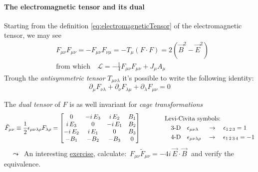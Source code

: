 \documentclass[class=article]{standalone}
\begin{document}
\paragraph{The electromagnetic tensor and its dual}
Starting from the definition \ref{eq:electromagneticTensor} of the electromagnetic tensor, we may see
\begin{equation*}
\begin{split}
& F_{\mu \nu} F_{\mu \nu} = - F_{\mu \nu} F_{\nu \mu} = - T_{\mu} (F \cdot F) = 2 (\vec B^2 - \vec E^2) \\
& \mbox{from which} \quad \mathcal{L} = - \frac{1}{4} F_{\mu \nu} F_{\mu \nu} + J_{\mu} A_{\mu}
\end{split}
\end{equation*}
Trough the \emph{antisymmetric tensor} $T_{\mu \nu \lambda}$ it's possible to write the following identity:
\begin{equation*}
\partial_{\mu} F_{\nu \lambda} + \partial_{\nu} F_{\lambda \mu} + \partial_{\lambda} F_{\mu \nu} = 0
\end{equation*}

The \emph{dual tensor} of $F$ is as well invariant for \emph{cage transformations}
\begin{equation*}
\begin{split}
\tilde{F}_{\mu \nu} \equiv \frac{1}{2} \epsilon_{\mu \nu \lambda \rho} F_{\lambda \rho} 
= \mqty[
0 	  & - i\,E_3 	&  i\,E_2 	& B_1 \\
i\,E_3 & 0     	&  - i\,E_1   	& B_2 \\
-i\,E_2 & i\,E_1   	&  0   	& B_3 \\
-B_1	  & -B_2	& -B_3 	& 0
]
\end{split} \quad\quad
\begin{split}
\quad\quad & \mbox{Levi-Civita symbols:} \\
&\quad \mbox{3-D} \quad \epsilon_{\mu \nu \lambda}  \;\,\quad\rightarrow\quad \epsilon_{1\, 2\, 3} = 1 \\
&\quad \mbox{4-D} \quad \epsilon_{\mu \nu \lambda \rho}  \quad\rightarrow\quad \epsilon_{1\, 2\, 3\, 4} = - 1
\end{split}
\end{equation*}
$\quad\leadsto \,$ An interesting \underline{exercise}, calculate: $\,F_{\mu \nu} \tilde{F}_{\mu \nu} = - 4 i \, \vec E \cdot \vec B \;$ and verify the equivalence.

\begin{center}
\end{center}
\end{document}
